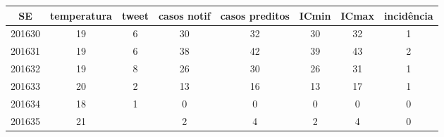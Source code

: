 \begin{tabular}{c|ccccccc}
  \hline
SE & temperatura & tweet & casos notif & casos preditos & ICmin & ICmax & incidência \\ 
  \hline
201630 & 19 & 6 & 30 & 32 & 30 & 32 & 1 \\ 
  201631 & 19 & 6 & 38 & 42 & 39 & 43 & 2 \\ 
  201632 & 19 & 8 & 26 & 30 & 26 & 31 & 1 \\ 
  201633 & 20 & 2 & 13 & 16 & 13 & 17 & 1 \\ 
  201634 & 18 & 1 & 0 & 0 & 0 & 0 & 0 \\ 
  201635 & 21 &  & 2 & 4 & 2 & 4 & 0 \\ 
   \hline
\end{tabular}

